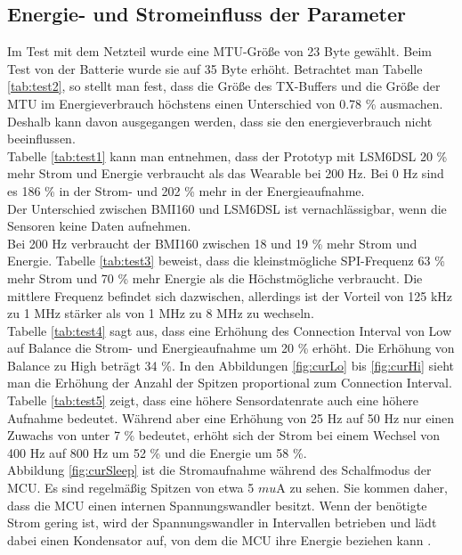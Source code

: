 \subsection{Energie- und Stromeinfluss der Parameter}
Im Test mit dem Netzteil wurde eine MTU-Größe von 23 Byte gewählt.
Beim Test von der Batterie wurde sie auf 35 Byte erhöht.
Betrachtet man Tabelle \ref{tab:test2}, so stellt man fest, dass die Größe des TX-Buffers und die Größe der MTU im Energieverbrauch höchstens einen Unterschied von 0.78 \% ausmachen.
Deshalb kann davon ausgegangen werden, dass sie den energieverbrauch nicht beeinflussen.\\
Tabelle \ref{tab:test1} kann man entnehmen, dass der Prototyp mit LSM6DSL 20 \% mehr Strom und Energie verbraucht als das Wearable bei 200 Hz.
Bei 0 Hz sind es 186 \% in der Strom- und 202 \% mehr in der Energieaufnahme.\\
Der Unterschied zwischen BMI160 und LSM6DSL ist vernachlässigbar, wenn die Sensoren keine Daten aufnehmen.\\
Bei 200 Hz verbraucht der BMI160 zwischen 18 und 19 \% mehr Strom und Energie.
Tabelle \ref{tab:test3} beweist, dass die kleinstmögliche SPI-Frequenz 63 \% mehr Strom und 70 \% mehr Energie als die Höchstmögliche verbraucht.
Die mittlere Frequenz befindet sich dazwischen, allerdings ist der Vorteil von 125 kHz zu 1 MHz stärker als von 1 MHz zu 8 MHz zu wechseln.\\
Tabelle \ref{tab:test4} sagt aus, dass eine Erhöhung des Connection Interval von Low auf Balance die Strom- und Energieaufnahme um 20 \% erhöht.
Die Erhöhung von Balance zu High beträgt 34 \%.
In den Abbildungen \ref{fig:curLo} bis \ref{fig:curHi} sieht man die Erhöhung der Anzahl der Spitzen proportional zum Connection Interval.\\
Tabelle \ref{tab:test5} zeigt, dass eine höhere Sensordatenrate auch eine höhere Aufnahme bedeutet.
Während aber eine Erhöhung von 25 Hz auf 50 Hz nur einen Zuwachs von unter 7 \% bedeutet, erhöht sich der Strom bei einem Wechsel von 400 Hz auf 800 Hz um 52 \% und die Energie um 58 \%.\\
Abbildung \ref{fig:curSleep} ist die Stromaufnahme während des Schalfmodus der MCU.
Es sind regelmäßig Spitzen von etwa 5 $mu$A zu sehen.
Sie kommen daher, dass die MCU einen internen Spannungswandler besitzt.
Wenn der benötigte Strom gering ist, wird der Spannungswandler in Intervallen betrieben und lädt dabei einen Kondensator auf, von dem die MCU ihre Energie beziehen kann \cite{site_refreshMode}.\\
